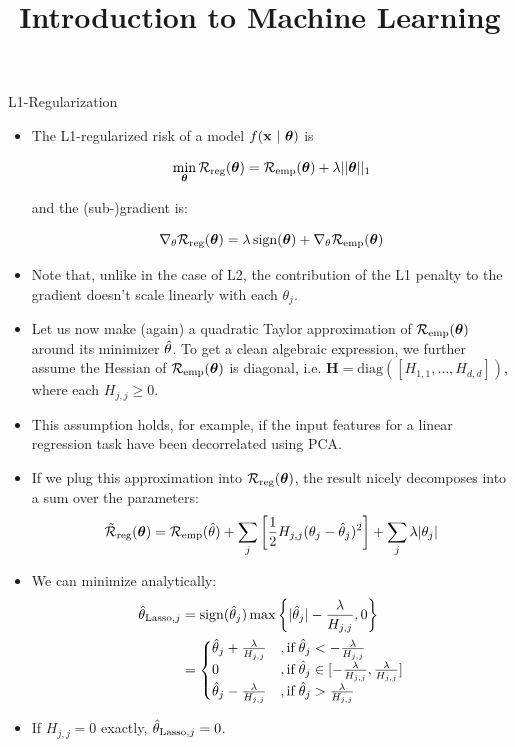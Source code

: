 \documentclass[11pt,compress,t,notes=noshow, xcolor=table]{beamer}
\title{Introduction to Machine Learning}
\date{}
\begin{document}

\begin{vbframe} {L1-Regularization}
  

  \begin{itemize}
    \item The L1-regularized risk of a model $f(\mathbf{x} ~|~ \bm{\theta})$ is

      \[
      \min_{\bm{\theta}} \mathcal{R}_{\text{reg}}(\bm{\theta}) = \mathcal{R}_{\text{emp}}(\bm{\theta}) + \lambda ||\bm{\theta}||_1
      \] 
      
      and the (sub-)gradient is:
      
      $$\nabla_{\theta} \mathcal{R}_{\text{reg}}(\bm{\theta}) = \lambda \operatorname{sign}(\bm{\theta}) + \nabla_{\theta} \mathcal{R}_{\text{emp}}(\bm{\theta})$$

    \item Note that, unlike in the case of L2, the contribution of the L1 penalty to the gradient doesn't scale linearly with each $\theta_j$. 
    \item Let us now make (again) a quadratic Taylor approximation of $\mathcal{R}_{\text{emp}}(\bm{\theta})$ around its minimizer $\hat{\theta}$. To get a clean algebraic expression, we further assume the Hessian of $\mathcal{R}_{\text{emp}}(\bm{\theta})$ is diagonal, i.e. $\bm{H} = \text{diag}([H_{1,1}, \ldots , H_{d,d}])$, where each $H_{j,j} \geq 0$.
    \item This assumption holds, for example, if the input features for a linear regression task have been decorrelated using PCA.
  \end{itemize}
  
  \framebreak
  
  \begin{itemize}
    \item If we plug this approximation into $\mathcal{R}_{\text{reg}}(\bm{\theta})$, the result nicely decomposes into a sum over the parameters:
  $$\mathcal{\tilde R}_{\text{reg}}(\bm{\theta}) = \mathcal{R}_{\text{emp}}(\hat{\theta}) + \sum_j \left[ \frac{1}{2} H_{j,j} (\theta_j - \hat{\theta}_j)^2 \right] + \sum_j \lambda |\theta_j|$$
    \item We can minimize analytically:
     \begin{align*}\hat{\theta}_{\text{Lasso},j} &= \operatorname{sign}(\hat{\theta}_j) \max \left\{ |\hat{\theta}_j| - \frac{\lambda}{H_{j,j}},0 \right\} \\
     &= \begin{cases} 
     \hat{\theta}_j + \frac{\lambda}{H_{j,j}} &, \text{if}   \;\hat{\theta}_j < -\frac{\lambda}{H_{j,j}} \\
       0 &, \text{if}   \;\hat{\theta}_j \in [-\frac{\lambda}{H_{j,j}}, \frac{\lambda}{H_{j,j}}] \\
     \hat{\theta}_j - \frac{\lambda}{H_{j,j}} &, \text{if}   \;\hat{\theta}_j > \frac{\lambda}{H_{j,j}} \\
     \end{cases}
     \end{align*}
  \item If $H_{j,j} = 0$ exactly, $\hat{\theta}_{\text{Lasso},j} = 0$.


\end{itemize}
\end{vbframe}
\end{document}
